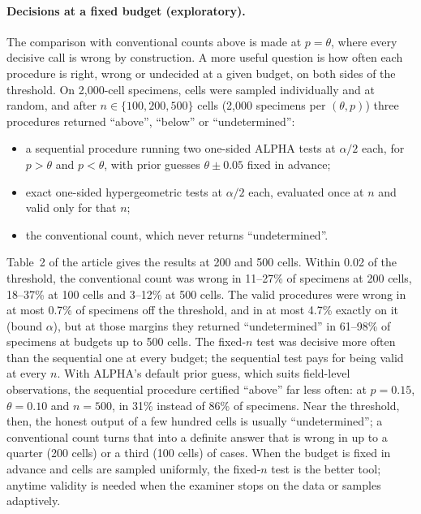 \documentclass[11pt]{article}
\theoremstyle{remark}
\theoremstyle{definition}
\begin{document}
\paragraph{Decisions at a fixed budget (exploratory).} The comparison with conventional counts above is made at $p=\theta$, where every decisive call is wrong by construction. A more useful question is how often each procedure is right, wrong or undecided at a given budget, on both sides of the threshold. On 2,000-cell specimens, cells were sampled individually and at random, and after $n\in\{100,200,500\}$ cells (2,000 specimens per $(\theta,p)$) three procedures returned ``above'', ``below'' or ``undetermined'':
\begin{itemize}
\item a sequential procedure running two one-sided ALPHA tests at $\alpha/2$ each, for $p>\theta$ and $p<\theta$, with prior guesses $\theta\pm0.05$ fixed in advance;
\item exact one-sided hypergeometric tests at $\alpha/2$ each, evaluated once at $n$ and valid only for that $n$;
\item the conventional count, which never returns ``undetermined''.
\end{itemize}
Table~2 of the article gives the results at 200 and 500 cells. Within 0.02 of the threshold, the conventional count was wrong in 11--27\% of specimens at 200 cells, 18--37\% at 100 cells and 3--12\% at 500 cells. The valid procedures were wrong in at most 0.7\% of specimens off the threshold, and in at most 4.7\% exactly on it (bound $\alpha$), but at those margins they returned ``undetermined'' in 61--98\% of specimens at budgets up to 500 cells. The fixed-$n$ test was decisive more often than the sequential one at every budget; the sequential test pays for being valid at every $n$. With ALPHA's default prior guess, which suits field-level observations, the sequential procedure certified ``above'' far less often: at $p=0.15$, $\theta=0.10$ and $n=500$, in 31\% instead of 86\% of specimens. Near the threshold, then, the honest output of a few hundred cells is usually ``undetermined''; a conventional count turns that into a definite answer that is wrong in up to a quarter (200 cells) or a third (100 cells) of cases. When the budget is fixed in advance and cells are sampled uniformly, the fixed-$n$ test is the better tool; anytime validity is needed when the examiner stops on the data or samples adaptively.
\end{document}
